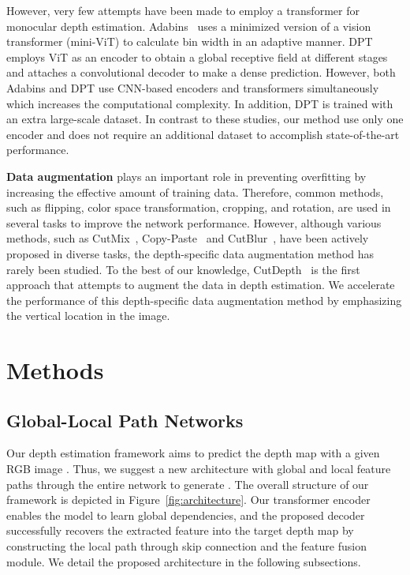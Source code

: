 \documentclass{article}
\makeatletter
\let\@internalcite\cite
\def\cite{\def\citeauthoryear##1##2{##1, ##2}\@internalcite}
\makeatother
\begin{document}
However, very few attempts have been made to employ a transformer for monocular depth estimation. Adabins~\cite{bhat2021adabins} uses a minimized version of a vision transformer (mini-ViT) to calculate bin width in an adaptive manner. 
DPT~\cite{ranftl2021vision} employs ViT as an encoder to obtain a global receptive field at different stages and attaches a convolutional decoder to make a dense prediction. 
However, both Adabins and DPT use CNN-based encoders and transformers simultaneously which increases the computational complexity. In addition, DPT is trained with an extra large-scale dataset. In contrast to these studies, our method use only one encoder and does not require an additional dataset to accomplish state-of-the-art performance.

\noindent\textbf{Data augmentation} plays an important role in preventing overfitting by increasing the effective amount of training data. Therefore, common methods, such as flipping, color space transformation, cropping, and rotation, are used in several tasks to improve the network performance. However, although various methods, such as  CutMix~\cite{DBLP:journals/corr/abs-1905-04899}, Copy-Paste~\cite{ghiasi2021simple} and CutBlur~\cite{yoo2020rethinking}, have been actively proposed in diverse tasks, the depth-specific data augmentation method has rarely been studied. To the best of our knowledge, CutDepth~\cite{ishii2021cutdepth} is the first approach that attempts to augment the data in depth estimation. We accelerate the performance of this depth-specific data augmentation method by emphasizing the vertical location in the image.





\section{Methods}

\subsection{Global-Local Path Networks}
Our depth estimation framework aims to predict the depth map  with a given RGB image . 
Thus, we suggest a new architecture with global and local feature paths through the entire network to generate . The overall structure of our framework is depicted in Figure~\ref{fig:architecture}. 
Our transformer encoder~\cite{xie2021segformer} enables the model to learn global dependencies, and the proposed decoder successfully recovers the extracted feature into the target depth map by constructing the local path through skip connection and the feature fusion module. 
We detail the proposed architecture in the following subsections. 
\end{document}
